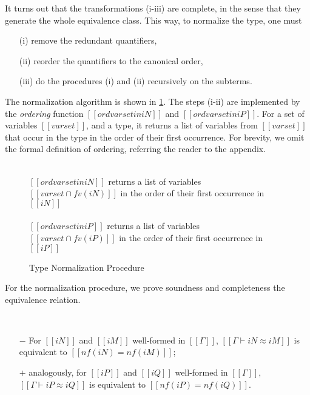 It turns out that the transformations (i-iii) are complete, 
in the sense that they generate the whole equivalence class.
This way, to normalize the type, one must
\begin{enumerate}
  \item [(i)] remove the redundant quantifiers,
  \item [(ii)] reorder the quantifiers to the canonical order,
  \item [(iii)] do the procedures (i) and (ii) recursively on the subterms.
\end{enumerate}

The normalization algorithm is shown in \cref{fig:type-nf}.
The steps (i-ii) are implemented by the \emph{ordering} function
$[[ord varset in iN]]$ and $[[ord varset in iP]]$.
For a set of variables $[[varset]]$, and a type, it 
returns a list of variables from $[[varset]]$ that occur in the type in 
the order of their first occurrence.
For brevity, we omit the formal definition of ordering,
referring the reader to the appendix.

\begin{figure}[h]
  
  \begin{multicols}{2}
  \ottdefnNrmNNormLabeled{}
  \\
  $[[ord varset in iN]]$ returns a list of variables
  $[[varset ∩ fv(iN)]]$ in the order of their first occurrence in $[[iN]]$
  \columnbreak\\
  \ottdefnNrmPNormLabeled{}
  \\
  $[[ord varset in iP]]$ returns a list of variables
  $[[varset ∩ fv(iP)]]$ in the order of their first occurrence in $[[iP]]$
  \end{multicols}


  \caption{Type Normalization Procedure} 
  \label{fig:type-nf}
\end{figure}


For the normalization procedure, 
we prove soundness and completeness \wrt the equivalence relation.
\begin{property}
  \hfill \\
  \begin{itemize}
    \item[$-$] For $[[iN]]$ and $[[iM]]$ well-formed in $[[Γ]]$,
  $[[Γ ⊢ iN ≈ iM]]$ is equivalent to $[[nf(iN) = nf(iM)]]$;
    \item[$+$] analogously, for $[[iP]]$ and $[[iQ]]$ well-formed in $[[Γ]]$,
  $[[Γ ⊢ iP ≈ iQ]]$ is equivalent to $[[nf(iP) = nf(iQ)]]$.
  \end{itemize}
\end{property}


